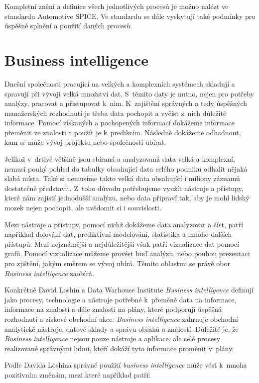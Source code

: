 \documentclass[czech,master]{diploma}
\begin{document}
Kompletní znění a definice všech jednotlivých procesů je možno nalézt ve standardu Automotive SPICE. \cite{ref:aspice_procesy} Ve standardu se dále vyskytují také podmínky pro úspěšné splnění a použití daných procesů.


\chapter{Business intelligence}
\label{sec:bi}
Dnešní společnosti pracující na velkých a komplexních systémech skladují a spravují při vývoji velká množství dat. S~těmito daty je nutno, nejen pro potřeby analýzy, pracovat a přistupovat k~nim. K~zajištění správných a tedy úspěšných manažerských rozhodnutí je třeba data pochopit a vyčíst z~nich důležité informace. Pomocí získaných a pochopených informací dokážeme informace přeměnit ve znalosti a použít je k~predikcím. Následně dokážeme odhadnout, kam se může vývoj projektu nebo společnosti ubírat.

Jelikož v~drtivé většině jsou sbíraná a analyzovaná data velká a komplexní, nemusí pouhý pohled do tabulky obsahující data celého podniku odhalit nějaká slabá místa. Také si nemusíme takto velká data obsahující i miliony záznamů dostatečně představit. Z~toho důvodu potřebujeme využít nástroje a přístupy, které nám zajistí jednodušší analýzu, nebo data připraví tak, aby je mohl lidský mozek nejen pochopit, ale uvědomit si i souvislosti.

Mezi nástroje a přístupy, pomocí nichž dokážeme data analyzovat a číst, patří například dolování dat, prediktivní modelování, statistika a mnoho dalších přístupů. Mezi nejznámější a nejdůležitější však patří vizualizace dat pomocí grafů. Pomocí vizualizace můžeme provést buď analýzu, nebo pouhou prezentaci pro zjištění, jakým směrem se vývoj ubírá. Těmito oblastmi se právě obor \textit{Business intelligence} zaobírá.

Konkrétně David Loshin \cite{ref:bi_loshin_david} a Data Warhouse Institute \textit{Business intelligence} definují jako procesy, technologie a nástroje potřebné k~přeměně data na informace, informace na znalosti a dále znalosti na plány, které podporují úspěšná rozhodnutí a ziskové obchodní akce. \textit{Business intelligence} zahrnuje obchodní analytické nástroje, datové sklady a správu obsahů a znalostí. Důležité je, že \textit{Business intelligence} nejsou pouze nástroje a aplikace, ale celé procesy realizované správnými lidmi, kteří dokáží tyto informace proměnit v~plány.

Podle Davida Loshina \cite{ref:bi_loshin_david} správné použití \textit{business intelligence} může vést k~mnoha pozitivním změnám, mezi které například patří:
\end{document}
